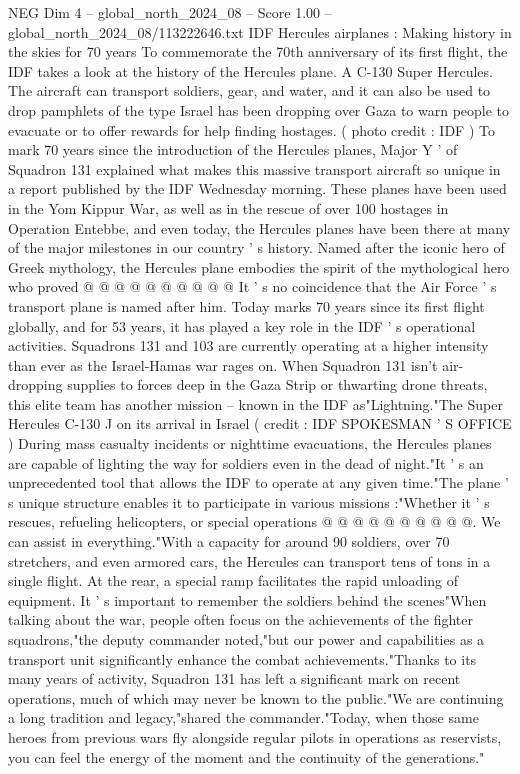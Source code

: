 \begin{textsample}{NEG Dim 4 – global\_north\_2024\_08 – Score 1.00 – global\_north\_2024\_08/113222646.txt}  \label{ex:f4_neg_293}
IDF Hercules airplanes : Making history in the skies for 70 years To commemorate the 70th anniversary of its first flight, the IDF takes a look at the history of the Hercules plane.
A C-130 Super Hercules.
The aircraft can transport soldiers, gear, and water, and it can also be used to drop pamphlets of the type Israel has been dropping over Gaza to warn people to evacuate or to offer rewards for help finding hostages. ( photo credit : IDF ) To mark 70 years since the introduction of the Hercules planes, Major Y ' of Squadron 131 explained what makes this massive transport aircraft so unique in a report published by the IDF Wednesday morning.
These planes have been used in the Yom Kippur War, as well as in the rescue of over 100 hostages in Operation Entebbe, and even today, the Hercules planes have been there at many of the major milestones in our country ' s history.
Named after the iconic hero of Greek mythology, the Hercules plane embodies the spirit of the mythological hero who proved @ @ @ @ @ @ @ @ @ @ It ' s no coincidence that the Air Force ' s transport plane is named after him.
Today marks 70 years since its first flight globally, and for 53 years, it has played a key role in the IDF ' s operational activities.
Squadrons 131 and 103 are currently operating at a higher intensity than ever as the Israel-Hamas war rages on.
When Squadron 131 isn't air-dropping supplies to forces deep in the Gaza Strip or thwarting drone threats, this elite team has another mission -- known in the IDF as"Lightning."The Super Hercules C-130 J on its arrival in Israel ( credit : IDF SPOKESMAN ' S OFFICE ) During mass casualty incidents or nighttime evacuations, the Hercules planes are capable of lighting the way for soldiers even in the dead of night."It ' s an unprecedented tool that allows the IDF to operate at any given time."The plane ' s unique structure enables it to participate in various missions :"Whether it ' s rescues, refueling helicopters, or special operations @ @ @ @ @ @ @ @ @ @.
We can assist in everything."With a capacity for around 90 soldiers, over 70 stretchers, and even armored cars, the Hercules can transport tens of tons in a single flight.
At the rear, a special ramp facilitates the rapid unloading of equipment.
It ' s important to remember the soldiers behind the scenes"When talking about the war, people often focus on the achievements of the fighter squadrons,"the deputy commander noted,"but our power and capabilities as a transport unit significantly enhance the combat achievements."Thanks to its many years of activity, Squadron 131 has left a significant mark on recent operations, much of which may never be known to the public."We are continuing a long tradition and legacy,"shared the commander."Today, when those same heroes from previous wars fly alongside regular pilots in operations as reservists, you can feel the energy of the moment and the continuity of the generations."

\end{textsample}
